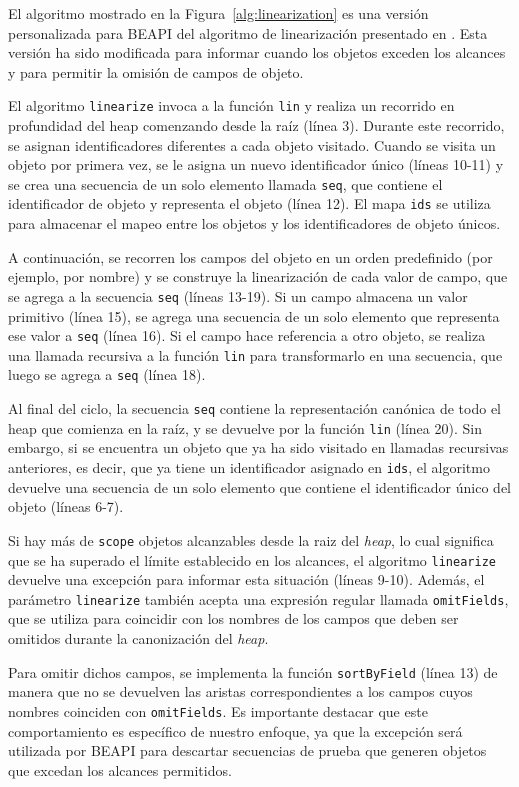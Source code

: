 El algoritmo mostrado en la Figura~\ref{alg:linearization} es una versión personalizada para \textsf{BEAPI} del algoritmo de linearización presentado en \cite{Xie04}. Esta versión ha sido modificada para informar cuando los objetos exceden los alcances y para permitir la omisión de campos de objeto.

El algoritmo \texttt{linearize} invoca a la función \texttt{lin} y realiza un recorrido en profundidad del heap comenzando desde la raíz (línea 3). Durante este recorrido, se asignan identificadores diferentes a cada objeto visitado. Cuando se visita un objeto por primera vez, se le asigna un nuevo identificador único (líneas 10-11) y se crea una secuencia de un solo elemento llamada \texttt{seq}, que contiene el identificador de objeto y representa el objeto (línea 12). El mapa \texttt{ids} se utiliza para almacenar el mapeo entre los objetos y los identificadores de objeto únicos.

A continuación, se recorren los campos del objeto en un orden predefinido (por ejemplo, por nombre) y se construye la linearización de cada valor de campo, que se agrega a la secuencia \texttt{seq} (líneas 13-19). Si un campo almacena un valor primitivo (línea 15), se agrega una secuencia de un solo elemento que representa ese valor a \texttt{seq} (línea 16). Si el campo hace referencia a otro objeto, se realiza una llamada recursiva a la función \texttt{lin} para transformarlo en una secuencia, que luego se agrega a \texttt{seq} (línea 18).

Al final del ciclo, la secuencia \texttt{seq} contiene la representación canónica de todo el heap que comienza en la raíz, y se devuelve por la función \texttt{lin} (línea 20). Sin embargo, si se encuentra un objeto que ya ha sido visitado en llamadas recursivas anteriores, es decir, que ya tiene un identificador asignado en \texttt{ids}, el algoritmo devuelve una secuencia de un solo elemento que contiene el identificador único del objeto (líneas 6-7).

Si hay más de \texttt{scope} objetos alcanzables desde la raiz del \emph{heap}, lo cual significa que se ha superado el límite establecido en los alcances, el algoritmo \texttt{linearize} devuelve una excepción para informar esta situación (líneas 9-10). Además, el parámetro \texttt{linearize} también acepta una expresión regular llamada \texttt{omitFields}, que se utiliza para coincidir con los nombres de los campos que deben ser omitidos durante la canonización del \emph{heap}.

Para omitir dichos campos, se implementa la función \texttt{sortByField} (línea 13) de manera que no se devuelven las aristas correspondientes a los campos cuyos nombres coinciden con \texttt{omitFields}. Es importante destacar que este comportamiento es específico de nuestro enfoque, ya que la excepción será utilizada por \textsf{BEAPI} para descartar secuencias de prueba que generen objetos que excedan los alcances permitidos.

